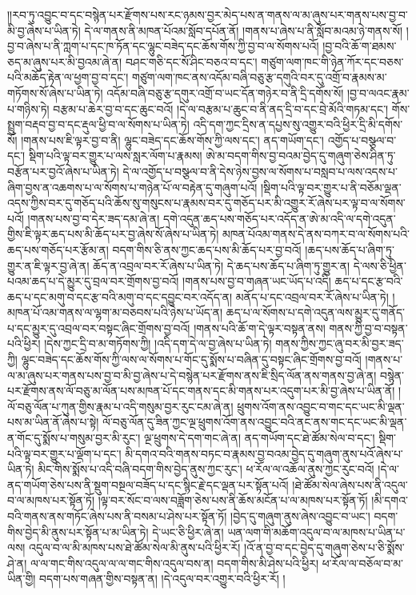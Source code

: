 །།རབ་ཏུ་འབྱུང་བ་དང་བསྙེན་པར་རྫོགས་པས་རང་ཉམས་བྱར་མེད་པས་ན་གནས་ལ་མ་ཞུས་པར་གནས་པས་བྱ་བ་མི་བྱ་ཞེས་པ་ཡིན་ཏེ། དེ་ལ་གནས་ནི་མཁན་པོའམ་སློབ་དཔོན་ནོ། །གནས་པ་ཞེས་པ་ནི་སློབ་མའམ་ཉེ་གནས་སོ། །བྱ་བ་ཞེས་པ་ནི་ཀླག་པ་དང་ཁ་ཏོན་དང་ལྷུང་བཟེད་དང་ཆོས་གོས་ཀྱི་བྱ་བ་ལ་སོགས་པའོ། །བྱ་བའི་ཆོ་ག་ཐམས་ཅད་མ་ཞུས་པར་མི་བྱའམ་ཞེ་ན། བཤང་གཅི་དང་སོ་ཤིང་བཅའ་བ་དང་། གཙུག་ལག་ཁང་གི་ཉེན་ཀོར་དང་བཅས་པའི་མཆོད་རྟེན་ལ་ཕྱག་བྱ་བ་དང་། གཙུག་ལག་ཁང་ནས་འདོམ་བཞི་བཅུ་རྩ་དགུའི་བར་དུ་འགྲོ་བ་རྣམས་མ་གཏོགས་སོ་ཞེས་པ་ཡིན་ཏེ། འདོམ་བཞི་བཅུ་རྩ་དགུར་འགྲོ་བ་ཡང་དོན་གཉེར་བ་ནི་དྲི་དགོས་སོ། །བྱ་བ་ལའང་རྣམ་པ་གཉིས་ཏེ། བརྩམ་པ་ཆེར་བྱ་བ་དང་ཆུང་བའོ། །དེ་ལ་བརྩམ་པ་ཆུང་བ་ནི་ནད་དྲི་བ་དང་བྲེ་མོའི་གཏམ་དང་། གོས་སྤྲུག་བརྡབ་བྱ་བ་དང་རྡུལ་ཕྱི་བ་ལ་སོགས་པ་ཡིན་ཏེ། འདི་དག་ཀྱང་དྲིས་ན་དཔྱས་སུ་འགྱུར་བའི་ཕྱིར་དྲི་མི་དགོས་སོ། །གནས་པས་ཇི་ལྟར་བྱ་བ་ནི། ལྷུང་བཟེད་དང་ཆོས་གོས་ཀྱི་ལས་དང་། ནད་གཡོག་དང་། འགྱོད་པ་བསྩལ་བ་དང་། སྡིག་པའི་ལྟ་བར་གྱུར་པ་ལས་སླར་ལོག་པ་རྣམས། ཨེ་མ་བདག་གིས་བྱ་བའམ་བྱེད་དུ་གཞུག་ཅེས་ཤིན་ཏུ་བརྩོན་པར་བྱའོ་ཞེས་པ་ཡིན་ཏེ། དེ་ལ་འགྱོད་པ་བསྩལ་བ་ནི་དེས་ཉེས་བྱས་ལ་སོགས་པ་བསླབ་པ་ལས་འདས་པ་ཞིག་བྱས་ན་འཆགས་པ་ལ་སོགས་པ་གཉེན་པོ་ལ་བརྟེན་དུ་གཞུག་པའོ། །སྡིག་པའི་ལྟ་བར་གྱུར་པ་ནི་བཅོམ་ལྡན་འདས་ཀྱིས་བར་དུ་གཅོད་པའི་ཆོས་སུ་གསུངས་པ་རྣམས་བར་དུ་གཅོད་པར་མི་འགྱུར་རོ་ཞེས་པར་ལྟ་བ་ལ་སོགས་པའོ། །གནས་པས་བྱ་བ་དེར་ཟད་དམ་ཞེ་ན། དགེ་འདུན་ཆད་པས་གཅོད་པར་འདོད་ན་ཨེ་མ་འདི་ལ་དགེ་འདུན་གྱིས་ཇི་ལྟར་ཆད་པས་མི་ཆོད་པར་བྱ་ཞེས་སོ་ཞེས་པ་ཡིན་ཏེ། མཁན་པོའམ་གནས་དེ་ནས་བཀར་བ་ལ་སོགས་པའི་ཆད་པས་གཅོད་པར་རྩོམ་ན། བདག་གིས་ཅི་ནས་ཀྱང་ཆད་པས་མི་ཆོད་པར་བྱ་བའོ། །ཆད་པས་ཆོད་པ་ཞིག་ཏུ་གྱུར་ན་ཇི་ལྟར་བྱ་ཞེ་ན། ཆོད་ན་འབྲལ་བར་རོ་ཞེས་པ་ཡིན་ཏེ། དེ་ཆད་པས་ཆོད་པ་ཞིག་ཏུ་གྱུར་ན། དེ་ལས་ཅི་ཕྱིན་པའམ་ཆད་པ་དེ་མྱུར་དུ་བྲལ་བར་གྲོགས་བྱ་བའོ། །གནས་པས་བྱ་བ་གཞན་ཡང་ཡོད་པ་འདི། ཆད་པ་དང་རྩ་བའི་ཆད་པ་དང་མགུ་བ་དང་རྩ་བའི་མགུ་བ་དང་དབྱུང་བར་འདོད་ན། མནོད་པ་དང་འབྲལ་བར་རོ་ཞེས་པ་ཡིན་ཏེ། །མཁན་པོ་འམ་གནས་ལ་ལྷག་མ་བཅབས་པའི་ཉེས་པ་ཡོད་ན། ཆད་པ་ལ་སོགས་པ་དགེ་འདུན་ལས་མྱུར་དུ་གནོད་པ་དང་མྱུར་དུ་འབྲལ་བར་བསྟང་ཞིང་གྲོགས་བྱ་བའོ། །གནས་པའི་ཆོ་ག་དེ་ལྟར་བསྟན་ནས། གནས་ཀྱི་བྱ་བ་བསྟན་པའི་ཕྱིར། །དེས་ཀྱང་དྲི་བ་མ་གཏོགས་ཀྱི། །འདི་དག་དེ་ལ་བྱ་ཞེས་པ་ཡིན་ཏེ། གནས་ཀྱིས་ཀྱང་ཞུ་བར་མི་བྱར་ཟད་ཀྱི། ལྷུང་བཟེད་དང་ཆོས་གོས་ཀྱི་ལས་ལ་སོགས་པ་གོང་དུ་སྨོས་པ་བཞིན་དུ་བསྟང་ཞིང་གྲོགས་བྱ་བའོ། །གནས་པ་ལ་མ་ཞུས་པར་གནས་པས་བྱ་བ་མི་བྱ་ཞེས་པ་དེ་བསྙེན་པར་རྫོགས་ནས་ཇི་སྲིད་ལོན་ནས་གནས་བྱ་ཞེ་ན། བསྙེན་པར་རྫོགས་ནས་ལོ་བཅུ་མ་ལོན་པས་མཁན་པོ་དང་གནས་དང་མི་གནས་པར་འདུག་པར་མི་བྱ་ཞེས་པ་ཡིན་ནོ། །ལོ་བཅུ་ལོན་པ་ཀུན་གྱིས་རྣམ་པ་འདི་གསུམ་བྱར་རུང་ངམ་ཞེ་ན། ཕྲུགས་འོག་ནས་འབྱུང་བ་གང་དང་ཡང་མི་ལྡན་པས་མ་ཡིན་ནོ་ཞེས་པ་སྟེ། ལོ་བཅུ་ལོན་དུ་ཟིན་ཀྱང་ལྔ་ཕྲུགས་འོག་ནས་འབྱུང་བའི་ནང་ནས་གང་དང་ཡང་མི་ལྡན་ན་གོང་དུ་སྨོས་པ་གསུམ་བྱར་མི་རུང་། ལྔ་ཕྲུགས་དེ་དག་གང་ཞེ་ན། ནད་གཡོག་དང་ཐེ་ཚོམ་སེལ་བ་དང་། སྡིག་པའི་ལྟ་བར་གྱུར་པ་ལྡོག་པ་དང་། མི་དགའ་བའི་གནས་བཏང་བ་རྣམས་བྱ་བའམ་བྱེད་དུ་གཞུག་ནུས་པའོ་ཞེས་པ་ཡིན་ཏེ། མིང་གིས་སྨོས་པ་འདི་བཞི་བདག་གིས་བྱེད་ནུས་ཀྱང་རུང་། ཕ་རོལ་ལ་འཆོལ་ནུས་ཀྱང་རུང་བའོ། །དེ་ལ་ནད་གཡོག་ཅེས་པས་ནི་སྡུག་བསྔལ་བཟོད་པ་དང་སྙིང་རྗེ་དང་ལྡན་པར་སྟོན་པའོ། །ཐེ་ཚོམ་སེལ་ཞེས་པས་ནི་འདུལ་བ་ལ་མཁས་པར་སྟོན་ཏོ། །ལྟ་བར་སོང་བ་ལས་བཟློག་ཅེས་པས་ནི་ཆོས་མངོན་པ་ལ་མཁས་པར་སྟོན་ཏོ། །མི་དགའ་བའི་གནས་ནས་གཏོང་ཞེས་པས་ནི་བསམ་པ་ཤེས་པར་སྟོན་ཏོ། །བྱེད་དུ་གཞུག་ནུས་ཞེས་འབྱུང་བ་ཡང་། བདག་གིས་བྱེད་མི་ནུས་པར་སྟོན་པ་མ་ཡིན་ཏེ། དེ་ཡང་ཅི་ཕྱིར་ཞེ་ན། ཡན་ལག་གི་མཆོག་འདུལ་བ་ལ་མཁས་པ་ཡིན་པ་ལས། འདུལ་བ་ལ་མི་མཁས་པས་ཐེ་ཚོམ་སེལ་མི་ནུས་པའི་ཕྱིར་རོ། །འོ་ན་བྱ་བ་དང་བྱེད་དུ་གཞུག་ཅེས་པ་ཅི་སྨོས་ཤེ་ན། ལ་ལ་གང་གིས་འདུལ་ལ་ལ་གང་གིས་འདུལ་བས་ན། བདག་གིས་མི་ཤེས་པའི་ཕྱིར། ཕ་རོལ་ལ་བཅོལ་བ་མ་ཡིན་གྱི། བདག་པས་གཞན་གྱིས་བསྟན་ན། །དེ་འདུལ་བར་འགྱུར་བའི་ཕྱིར་རོ། །
